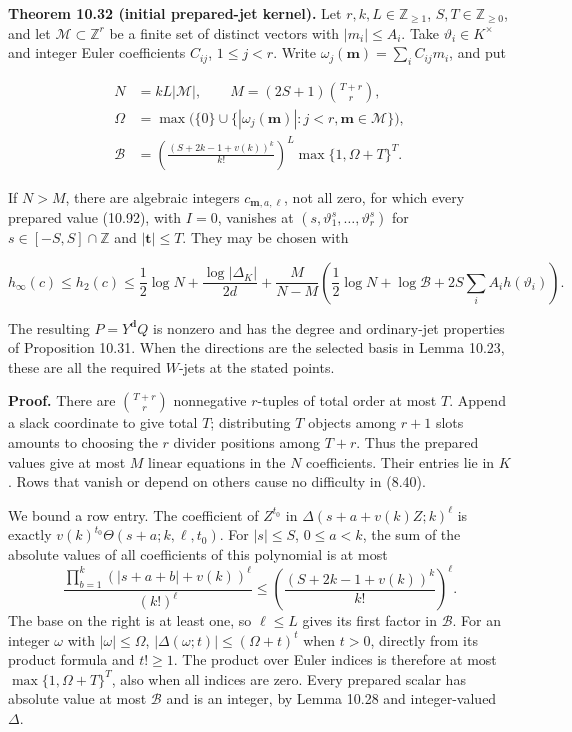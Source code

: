 \documentclass[
  11pt,
  a4paper,
]{article}
\begin{document}
\textbf{Theorem 10.32 (initial prepared-jet kernel).} Let
\(r,k,L\in\mathbb Z_{\ge1}\), \(S,T\in\mathbb Z_{\ge0}\), and let
\(\mathcal M\subset\mathbb Z^r\) be a finite set of distinct vectors
with \(|m_i|\le A_i\). Take \(\vartheta_i\in K^\times\) and integer
Euler coefficients \(C_{ij}\), \(1\le j<r\). Write
\(\omega_j(\boldsymbol m)=\sum_iC_{ij}m_i\), and put

\[
\begin{aligned}
N&=kL|\mathcal M|,\qquad M=(2S+1)\binom{T+r}{r},\\
\Omega&=\max\bigl(\{0\}\cup\{|\omega_j(\boldsymbol m)|:j<r,\boldsymbol m\in\mathcal M\}\bigr),\\
\mathcal B&=\left(\frac{(S+2k-1+v(k))^k}{k!}\right)^L
\max\{1,\Omega+T\}^{T}.
\end{aligned}
\tag{10.95}
\]

If \(N>M\), there are algebraic integers \(c_{\boldsymbol m,a,\ell}\),
not all zero, for which every prepared value (10.92), with \(I=0\),
vanishes at \((s,\vartheta_1^s,\ldots,\vartheta_r^s)\) for
\(s\in[-S,S]\cap\mathbb Z\) and \(|\boldsymbol t|\le T\). They may be
chosen with

\[
h_\infty(c)\le h_2(c)\le
\frac12\log N+\frac{\log|\Delta_K|}{2d}
+\frac{M}{N-M}
\left(\frac12\log N+\log\mathcal B
+2S\sum_i A_i h(\vartheta_i)\right).
\tag{10.96}
\]

The resulting \(P=Y^{\boldsymbol d}Q\) is nonzero and has the degree and
ordinary-jet properties of Proposition 10.31. When the directions are
the selected basis in Lemma 10.23, these are all the required \(W\)-jets
at the stated points.

\textbf{Proof.} There are \(\binom{T+r}{r}\) nonnegative \(r\)-tuples of
total order at most \(T\). Append a slack coordinate to give total
\(T\); distributing \(T\) objects among \(r+1\) slots amounts to
choosing the \(r\) divider positions among \(T+r\). Thus the prepared
values give at most \(M\) linear equations in the \(N\) coefficients.
Their entries lie in \(K\). Rows that vanish or depend on others cause
no difficulty in (8.40).

We bound a row entry. The coefficient of \(Z^{t_0}\) in
\(\Delta(s+a+v(k)Z;k)^\ell\) is exactly
\(v(k)^{t_0}\Theta(s+a;k,\ell,t_0)\). For \(|s|\le S\), \(0\le a<k\),
the sum of the absolute values of all coefficients of this polynomial is
at most \[
\frac{\prod_{b=1}^k(|s+a+b|+v(k))^\ell}{(k!)^\ell}
\le\left(\frac{(S+2k-1+v(k))^k}{k!}\right)^\ell.
\] The base on the right is at least one, so \(\ell\le L\) gives its
first factor in \(\mathcal B\). For an integer \(\omega\) with
\(|\omega|\le\Omega\), \(|\Delta(\omega;t)|\le(\Omega+t)^t\) when
\(t>0\), directly from its product formula and \(t!\ge1\). The product
over Euler indices is therefore at most \(\max\{1,\Omega+T\}^{T}\), also
when all indices are zero. Every prepared scalar has absolute value at
most \(\mathcal B\) and is an integer, by Lemma 10.28 and integer-valued
\(\Delta\).
\end{document}
